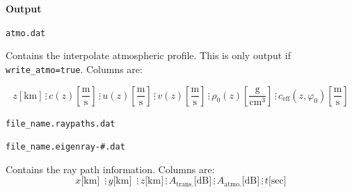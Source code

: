 \documentclass[10pt]{article}
\begin{document}
\vspace{0.01\textheight}


 \hspace{-0.25in}\textbf{Output}\newline

	\verb=atmo.dat= 
	
	Contains the interpolate atmospheric profile.  This is only output if \verb#write_atmo=true#.  Columns are:
	\begin{small}
	\begin{equation*}
	 z \left[ \text{km} \right] \hspace{2pt} \vdots \hspace{2pt}
	 c (z) \left[\frac{\text{m}}{\text{s}} \right] \hspace{2pt} \vdots \hspace{2pt}
	 u(z) \left[ \frac{\text{m}}{\text{s}} \right] \hspace{2pt} \vdots \hspace{2pt}
	 v(z) \left[ \frac{\text{m}}{\text{s}} \right] \hspace{2pt} \vdots \hspace{2pt}
	 \rho_0(z) \left[ \frac{\text{g}}{\text{cm}^3} \right] \hspace{2pt} \vdots \hspace{2pt}
	 c_\text{eff} \left(z, \varphi_0 \right) \left[\frac{\text{m}}{\text{s}} \right] 
	\end{equation*}
	\end{small}

\newpage

	\verb=file_name.raypaths.dat= 

	\verb=file_name.eigenray-#.dat= 
	
	Contains the ray path information.  Columns are:
	\begin{equation*}
	x \text{[km] } \hspace{2pt} \vdots \hspace{2pt} 
	y \text{[km] } \hspace{2pt} \vdots \hspace{2pt}  
	z\text{[km]} \hspace{2pt} \vdots \hspace{2pt} 
	A_\text{trans.} \text{[dB]} \hspace{2pt} \vdots \hspace{2pt}
	A_\text{atmo.} \text{[dB]} \hspace{2pt} \vdots \hspace{2pt}	
	t \text{[sec]}
	\end{equation*}
\end{document}
